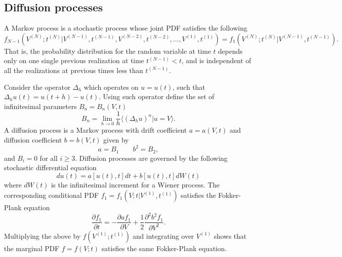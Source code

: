 \documentclass[oneside,a4paper,11pt]{report}
\begin{document}
\subsection{Diffusion processes}

A Markov process is a stochastic process whose joint PDF satisfies the following
\begin{equation}
f_{N-1}(V^{(N)};t^{(N)}| V^{(N-1)}, t^{(N-1)}, V^{(N-2)}, t^{(N-2)}, ... , V^{(1)}, t^{(1)}) = f_1(V^{(N)}; t^{(N)} | V^{(N-1)}, t^{(N-1)}). 
\end{equation}
That is, the probability distribution for the random variable at time $t$ depends only on one single previous realization at time $t^{(N-1)} < t$, and is independent of all the realizations at previous times less than $t^{(N-1)}$.

Consider the operator $\Delta_h$ which operates on $u = u(t)$, such that $\Delta_h u(t) = u(t+h) - u(t)$. Using such operator define the set of infinitesimal parameters $B_n = B_n(V,t)$
\begin{equation}
B_n = \lim_{h\to0} \frac{1}{h} \langle ( \Delta_h u )^n | u = V \rangle.
\end{equation}
A diffusion process is a Markov process with drift coefficient $a = a(V,t)$ and diffusion coefficient $b = b(V,t)$ given by
\begin{equation}
a = B_1 \qquad
b^2 = B_2,
\end{equation}
and $B_i = 0$ for all $i \ge 3$. Diffusion processes  are governed by the following stochastic differential equation
\begin{equation}
du(t) = a[u(t),t] dt + b[u(t),t] dW(t)
\end{equation}
where $dW(t)$ is the infinitesimal increment for a Wiener process. The corresponding conditional PDF $f_1 = f_1(V;t | V^{(1)},t^{(1)})$ satisfies the Fokker-Plank equation
\begin{equation}
\frac{\partial f_1}{\partial t} = - \frac{\partial a f_1}{\partial V} + \frac{1}{2} \frac{\partial ^2 b^2 f_1}{\partial V^2}.
\end{equation}
Multiplying the above by $f(V^{(1)};t^{(1)})$ and integrating over $V^{(1)}$ shows that the marginal PDF $f = f(V;t)$ satisfies the same Fokker-Plank equation.
\end{document}
